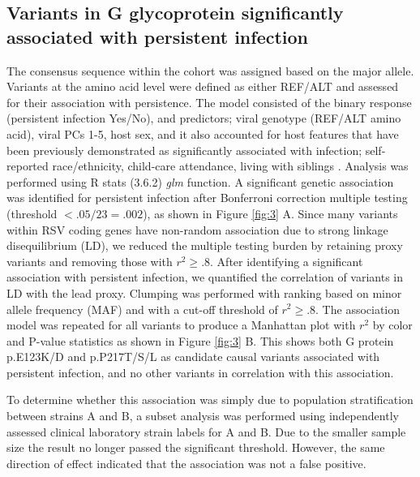 \documentclass{article}
\begin{document}
\subsection{Variants in G glycoprotein significantly associated with persistent infection}
The consensus sequence within the cohort was assigned based on the major allele.
Variants at the amino acid level were defined as either REF/ALT and assessed for their association with persistence.
The model consisted of
the binary response (persistent infection Yes/No),
and predictors; viral genotype (REF/ALT amino acid), viral PCs 1-5, host sex, and it also accounted for host features that have been previously demonstrated as significantly associated with infection;
self-reported race/ethnicity, child-care attendance, living with siblings
\cite{hall1976respiratory}.
Analysis was performed using R stats (3.6.2) \textit{glm} function. 
A significant genetic association was identified for persistent infection after Bonferroni correction multiple testing (threshold $<.05/23=.002$), 
as shown in 
Figure \ref{fig:3} A. 
Since many variants within RSV coding genes have non-random association due to strong linkage disequilibrium (LD), 
we reduced the multiple testing burden by retaining proxy variants and removing those with
$r^2 \ge .8$.
After identifying a significant association with persistent infection,
we quantified the correlation of variants in LD with the lead proxy.
Clumping was performed with ranking based on minor allele frequency (MAF) and with a cut-off threshold of $r^2 \ge .8$.
The association model was repeated for all variants to produce a Manhattan plot with $r^2$ by color and P-value statistics as shown in 
Figure \ref{fig:3} B.
This shows both G protein 
p.E123K/D and 
p.P217T/S/L as candidate causal variants associated with persistent infection, and no other variants in correlation with this association. 

To determine whether this association was simply due to population stratification between strains A and B, a subset analysis was performed using independently assessed clinical laboratory strain labels for A and B.
Due to the smaller sample size the result no longer passed the significant threshold. 
However, the same direction of effect indicated that the association was not a false positive. 
\end{document}
